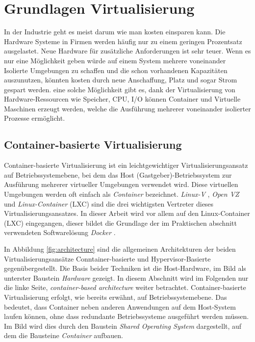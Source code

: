 \thispagestyle{empty}

\section{Grundlagen Virtualisierung}

In der Industrie geht es meist darum wie man kosten einsparen kann. Die Hardware Systeme in Firmen werden häufig nur zu einem geringen Prozentsatz ausgelastet. Neue Hardware für zusätzliche Anforderungen ist sehr teuer. Wenn es nur eine Möglichkeit geben würde auf einem System mehrere voneinander Isolierte Umgebungen zu schaffen und die schon vorhandenen Kapazitäten auszunutzen, könnten kosten durch neue Anschaffung, Platz und sogar Strom gespart werden. eine solche Möglichkeit gibt es, dank der Virtualisierung von Hardware-Ressourcen wie Speicher, CPU, I/O können Container und Virtuelle Maschinen erzeugt werden, welche die Ausführung mehrerer voneinander isolierter Prozesse ermöglicht.

\pagebreak

\subsection{Container-basierte Virtualisierung}
Container-basierte Virtualisierung ist ein leichtgewichtiger Virtualisierungsansatz auf Betriebssystemebene, bei dem das Host (Gastgeber)-Betriebssystem zur Ausführung mehrerer virtueller Umgebungen verwendet wird. Diese virtuellen Umgebungen werden oft einfach als \emph{Container} bezeichnet. \emph{Linux-V} \cite{Overview2018PaperLinux-VServer}, \emph{Open VZ} \cite{IndexOpenvz.org} und \emph{Linux-Container} (LXC) \cite{IndexLinuxcontainers.Org} sind die drei wichtigsten Vertreter dieses Virtualisierungsansatzes. In dieser Arbeit wird vor allem auf den Linux-Container (LXC) eingegangen, dieser bildet die Grundlage der im Praktischen abschnitt verwendeten Softwarelösung \emph{Docker} \cite{MeineDockerPlatform}. 

In Abbildung \ref{fig:architecture} sind die allgemeinen Architekturen der beiden Virtualisierungsansätze Conntainer-basierte und Hypervisor-Basierte gegenübergestellt. Die Basis beider Techniken ist die Host-Hardware, im Bild als unterster Baustein \emph{Hardware} gezeigt. In diesem Abschnitt wird im Folgenden nur die linke Seite, \emph{container-based architecture} weiter betrachtet. Container-basierte Virtualisierung erfolgt, wie bereits erwähnt, auf Betriebssystemebene. Das bedeutet, dass Container neben anderen Anwendungen auf dem Host-System laufen können, ohne dass redundante Betriebssysteme ausgeführt werden müssen. Im Bild wird dies durch den Baustein \emph{Shared Operating System} dargestellt, auf dem die Bausteine \emph{Container} aufbauen. 

